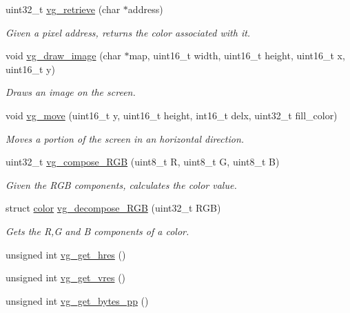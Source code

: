 \begin{DoxyCompactItemize}
uint32\+\_\+t \mbox{\hyperlink{group__video_ga8ff5bbb05f1cb62f5958290a45723571}{vg\+\_\+retrieve}} (char $\ast$address)
\begin{DoxyCompactList}\small\item\em Given a pixel address, returns the color associated with it. \end{DoxyCompactList}\item 
void \mbox{\hyperlink{group__video_ga1362f68261a0b7dcb4d00ca0a3ebb238}{vg\+\_\+draw\+\_\+image}} (char $\ast$map, uint16\+\_\+t width, uint16\+\_\+t height, uint16\+\_\+t x, uint16\+\_\+t y)
\begin{DoxyCompactList}\small\item\em Draws an image on the screen. \end{DoxyCompactList}\item 
void \mbox{\hyperlink{group__video_ga1ff6d214ea6b767e283a9973bd129c7e}{vg\+\_\+move}} (uint16\+\_\+t y, uint16\+\_\+t height, int16\+\_\+t delx, uint32\+\_\+t fill\+\_\+color)
\begin{DoxyCompactList}\small\item\em Moves a portion of the screen in an horizontal direction. \end{DoxyCompactList}\item 
uint32\+\_\+t \mbox{\hyperlink{group__video_ga28573f33d778f8dfd39474a8154ef416}{vg\+\_\+compose\+\_\+\+R\+GB}} (uint8\+\_\+t R, uint8\+\_\+t G, uint8\+\_\+t B)
\begin{DoxyCompactList}\small\item\em Given the R\+GB components, calculates the color value. \end{DoxyCompactList}\item 
struct \mbox{\hyperlink{structcolor}{color}} \mbox{\hyperlink{group__video_ga9fcd5199ebdc148ef21c1faea7280d3f}{vg\+\_\+decompose\+\_\+\+R\+GB}} (uint32\+\_\+t R\+GB)
\begin{DoxyCompactList}\small\item\em Gets the R,G and B components of a color. \end{DoxyCompactList}\item 
unsigned int \mbox{\hyperlink{group__video_gaa4a211ebfc5c87a0072eaf9bd03e3a56}{vg\+\_\+get\+\_\+hres}} ()
\item 
unsigned int \mbox{\hyperlink{group__video_ga4633499e0f197ac855f56473fc9fb291}{vg\+\_\+get\+\_\+vres}} ()
\item 
unsigned int \mbox{\hyperlink{group__video_gad5d72716b0e4b468c37027482a707763}{vg\+\_\+get\+\_\+bytes\+\_\+pp}} ()

\end{DoxyCompactItemize}
